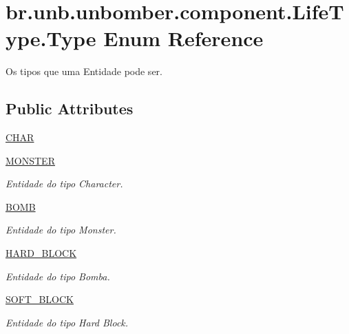\hypertarget{enumbr_1_1unb_1_1unbomber_1_1component_1_1_life_type_1_1_type}{\section{br.\+unb.\+unbomber.\+component.\+Life\+Type.\+Type Enum Reference}
\label{enumbr_1_1unb_1_1unbomber_1_1component_1_1_life_type_1_1_type}
}


Os tipos que uma Entidade pode ser.  


\subsection*{Public Attributes}
\begin{DoxyCompactItemize}
\item 
\hyperlink{enumbr_1_1unb_1_1unbomber_1_1component_1_1_life_type_1_1_type_a1fe2b3c4598a09a0d250a2d025e16908}{C\+H\+A\+R}
\item 
\hyperlink{enumbr_1_1unb_1_1unbomber_1_1component_1_1_life_type_1_1_type_a62292fe6af355b045cb8ec241e0d5ad1}{M\+O\+N\+S\+T\+E\+R}
\begin{DoxyCompactList}\small\item\em Entidade do tipo Character. \end{DoxyCompactList}\item 
\hyperlink{enumbr_1_1unb_1_1unbomber_1_1component_1_1_life_type_1_1_type_a05ebe19d1e03884c4f1215e4fcfb84a3}{B\+O\+M\+B}
\begin{DoxyCompactList}\small\item\em Entidade do tipo Monster. \end{DoxyCompactList}\item 
\hyperlink{enumbr_1_1unb_1_1unbomber_1_1component_1_1_life_type_1_1_type_adda78c27882755642e382df58805c5b7}{H\+A\+R\+D\+\_\+\+B\+L\+O\+C\+K}
\begin{DoxyCompactList}\small\item\em Entidade do tipo Bomba. \end{DoxyCompactList}\item 
\hyperlink{enumbr_1_1unb_1_1unbomber_1_1component_1_1_life_type_1_1_type_a1770b750cafe46b02ef1071ffdaef821}{S\+O\+F\+T\+\_\+\+B\+L\+O\+C\+K}
\begin{DoxyCompactList}\small\item\em Entidade do tipo Hard Block. \end{DoxyCompactList}\end{DoxyCompactItemize}


